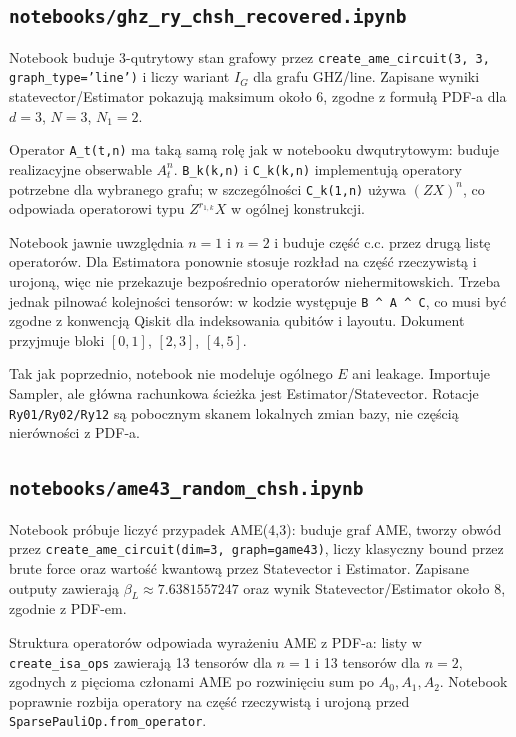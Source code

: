 \documentclass[12pt]{article}
\begin{document}
\subsection{\texttt{notebooks/ghz\_ry\_chsh\_recovered.ipynb}}

Notebook buduje 3-qutrytowy stan grafowy przez
\texttt{create\_ame\_circuit(3, 3, graph\_type='line')} i liczy wariant $I_G$ dla grafu
GHZ/line. Zapisane wyniki statevector/Estimator pokazuj\k{a} maksimum oko\l{}o $6$,
zgodne z formu\l{}\k{a} PDF-a dla $d=3$, $N=3$, $N_1=2$.

Operator \texttt{A\_t(t,n)} ma tak\k{a} sam\k{a} rol\k{e} jak w notebooku dwqutrytowym:
buduje realizacyjne obserwable $A_t^n$. \texttt{B\_k(k,n)} i \texttt{C\_k(k,n)} implementuj\k{a}
operatory potrzebne dla wybranego grafu; w szczeg\'olno\'sci \texttt{C\_k(1,n)} u\.zywa
$(ZX)^n$, co odpowiada operatorowi typu $Z^{r_{1,k}}X$ w og\'olnej konstrukcji.

Notebook jawnie uwzgl\k{e}dnia $n=1$ i $n=2$ i buduje cz\k{e}\'s\'c c.c. przez drug\k{a} list\k{e}
operator\'ow. Dla Estimatora ponownie stosuje rozk\l{}ad na cz\k{e}\'s\'c rzeczywist\k{a}
i urojon\k{a}, wi\k{e}c nie przekazuje bezpo\'srednio operator\'ow niehermitowskich.
Trzeba jednak pilnowa\'c kolejno\'sci tensor\'ow: w kodzie wyst\k{e}puje \texttt{B \^{} A \^{} C},
co musi by\'c zgodne z konwencj\k{a} Qiskit dla indeksowania qubit\'ow i layoutu. Dokument
przyjmuje bloki $[0,1]$, $[2,3]$, $[4,5]$.

Tak jak poprzednio, notebook nie modeluje og\'olnego $E$ ani leakage. Importuje Sampler,
ale g\l{}\'owna rachunkowa \'scie\.zka jest Estimator/Statevector. Rotacje
\texttt{Ry01/Ry02/Ry12} s\k{a} pobocznym skanem lokalnych zmian bazy, nie cz\k{e}\'sci\k{a}
nier\'owno\'sci z PDF-a.

\subsection{\texttt{notebooks/ame43\_random\_chsh.ipynb}}

Notebook pr\'obuje liczy\'c przypadek AME(4,3): buduje graf AME, tworzy obw\'od przez
\texttt{create\_ame\_circuit(dim=3, graph=game43)}, liczy klasyczny bound przez brute force
oraz warto\'s\'c kwantow\k{a} przez Statevector i Estimator. Zapisane outputy zawieraj\k{a}
$\beta_L\approx7.6381557247$ oraz wynik Statevector/Estimator oko\l{}o $8$, zgodnie z PDF-em.

Struktura operator\'ow odpowiada wyra\.zeniu AME z PDF-a: listy w \texttt{create\_isa\_ops}
zawieraj\k{a} 13 tensor\'ow dla $n=1$ i 13 tensor\'ow dla $n=2$, zgodnych z pi\k{e}cioma
cz\l{}onami AME po rozwini\k{e}ciu sum po $A_0,A_1,A_2$. Notebook poprawnie rozbija
operatory na cz\k{e}\'s\'c rzeczywist\k{a} i urojon\k{a} przed \texttt{SparsePauliOp.from\_operator}.
\end{document}
